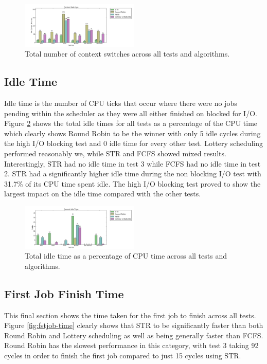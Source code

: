 \documentclass{acm_proc_article-sp}
\begin{document}
\begin{figure}[H]
\centering
\includegraphics[width=0.5\textwidth]{ctex_switches.png}
\caption{Total number of context switches across all tests and algorithms.}
\label{fig:ctex-switches}
\end{figure}

\subsection{Idle Time}
Idle time is the number of CPU ticks that occur where there were no jobs pending within the scheduler as they were all either finished on blocked for I/O. Figure \ref{fig:idle-time} shows the total idle times for all tests as a percentage of the CPU time which clearly shows Round Robin to be the winner with only 5 idle cycles during the high I/O blocking test and 0 idle time for every other test. Lottery scheduling performed reasonably we, while STR and FCFS showed mixed results. Interestingly, STR had no idle time in test 3 while FCFS had no idle time in test 2. STR had a significantly higher idle time during the non blocking I/O test with 31.7\% of its CPU time spent idle. The high I/O blocking test proved to show the largest impact on the idle time compared with the other tests.

\begin{figure}[H]
\centering
\includegraphics[width=0.5\textwidth]{idle_time_per.png}
\caption{Total idle time as a percentage of CPU time across all tests and algorithms.}
\label{fig:idle-time}
\end{figure}

\subsection{First Job Finish Time}
\label{results-fstjob-time}
This final section shows the time taken for the first job to finish across all tests. Figure \ref{fig:fstjob-time} clearly shows that STR to be significantly faster than both Round Robin and Lottery scheduling as well as being generally faster than FCFS. Round Robin has the slowest performance in this category, with test 3 taking 92 cycles in order to finish the first job compared to just 15 cycles using STR.
\end{document}
